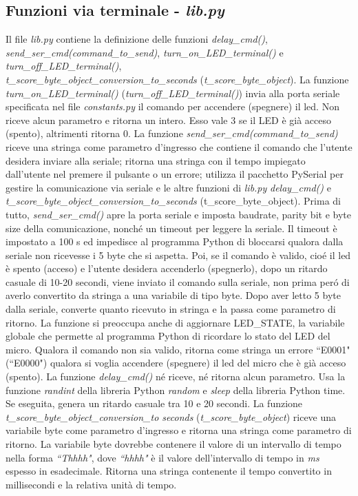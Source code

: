 \documentclass[a4paper]{article}
\begin{document}
\subsection{Funzioni via terminale - \textit{lib.py}}
Il file \textit{lib.py} contiene la definizione delle funzioni \textit{delay\_cmd()}, \textit{send\_ser\_cmd(command\_to\_send)},  \textit{turn\_on\_LED\_terminal()} e \textit{turn\_off\_LED\_terminal()}, \\ \textit{t\_score\_byte\_object\_conversion\_to\_seconds} (\textit{t\_score\_byte\_object}).
\newline
La funzione \textit{turn\_on\_LED\_terminal()} (\textit{turn\_off\_LED\_terminal()}) invia alla porta seriale specificata nel file \textit{constants.py} il comando per accendere (spegnere) il led. Non riceve alcun parametro e ritorna un intero. Esso vale 3 se il LED \`{e} gi\`{a} acceso (spento), altrimenti ritorna 0.
\newline
La funzione \textit{send\_ser\_cmd(command\_to\_send)} riceve una stringa come parametro d'ingresso che contiene il comando che l'utente desidera inviare alla seriale; ritorna una stringa con il tempo impiegato dall'utente nel premere il pulsante o un errore; utilizza il pacchetto PySerial per gestire la comunicazione via seriale e le altre funzioni di \textit{lib.py} \textit{delay\_cmd()} e \textit{t\_score\_byte\_object\_conversion\_to\_seconds} (t\_score\_byte\_object).
\newline
Prima di tutto, \textit{send\_ser\_cmd()} apre la porta seriale e imposta baudrate, parity bit e byte size della comunicazione, nonch\'{e} un timeout per leggere la seriale. Il timeout \`{e} impostato a 100 s ed impedisce al programma Python di bloccarsi qualora dalla seriale non ricevesse i 5 byte che si aspetta. Poi, se il comando \`{e} valido, cio\'{e} il led è spento (acceso) e l'utente desidera accenderlo (spegnerlo), dopo un ritardo casuale di 10-20 secondi, viene inviato il comando sulla seriale, non prima per\'{o} di averlo convertito da stringa a una variabile di tipo byte. Dopo aver letto 5 byte dalla seriale, converte quanto ricevuto in stringa e la passa come parametro di ritorno. La funzione si preoccupa anche di aggiornare LED\_STATE, la variabile globale che permette al programma Python di ricordare lo stato del LED del micro. Qualora il comando non sia valido, ritorna come stringa un errore ``E0001" (``E0000") qualora si voglia accendere (spegnere) il led del micro che \`{e} gi\`{a} acceso (spento).
La funzione \textit{delay\_cmd()} n\'{e} riceve, n\'{e} ritorna alcun parametro. Usa la funzione \textit{randint} della libreria Python \textit{random} e \textit{sleep} della libreria Python time. Se eseguita, genera un ritardo casuale tra 10 e 20 secondi.
La funzione  \textit{t\_score\_byte\_object\_conversion\_to seconds} (\textit{t\_score\_byte\_object}) riceve una variabile byte come parametro d'ingresso e ritorna una stringa come parametro di ritorno. La variabile byte dovrebbe contenere il valore di un intervallo di tempo nella forma \textit{``Thhhh"}, dove \textit{``hhhh"} è il valore dell'intervallo di tempo in \textit{ms} espesso in esadecimale. Ritorna una stringa contenente il tempo convertito in millisecondi e la relativa unità di tempo. 
\end{document}
